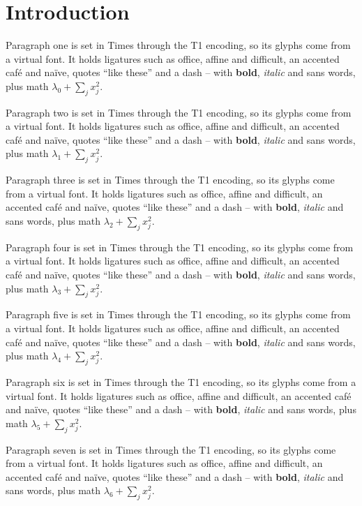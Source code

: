 \documentclass{article}
\begin{document}
\section{Introduction}

Paragraph one is set in Times through the T1 encoding, so its glyphs come from a virtual font.
It holds ligatures such as office, affine and difficult, an accented caf\'e and na\"ive, quotes ``like these''
and a dash -- with {\bfseries bold}, {\itshape italic} and {\sffamily sans} words, plus math $\lambda_0 + \sum_j x_j^2$.

Paragraph two is set in Times through the T1 encoding, so its glyphs come from a virtual font.
It holds ligatures such as office, affine and difficult, an accented caf\'e and na\"ive, quotes ``like these''
and a dash -- with {\bfseries bold}, {\itshape italic} and {\sffamily sans} words, plus math $\lambda_1 + \sum_j x_j^2$.

Paragraph three is set in Times through the T1 encoding, so its glyphs come from a virtual font.
It holds ligatures such as office, affine and difficult, an accented caf\'e and na\"ive, quotes ``like these''
and a dash -- with {\bfseries bold}, {\itshape italic} and {\sffamily sans} words, plus math $\lambda_2 + \sum_j x_j^2$.

Paragraph four is set in Times through the T1 encoding, so its glyphs come from a virtual font.
It holds ligatures such as office, affine and difficult, an accented caf\'e and na\"ive, quotes ``like these''
and a dash -- with {\bfseries bold}, {\itshape italic} and {\sffamily sans} words, plus math $\lambda_3 + \sum_j x_j^2$.

Paragraph five is set in Times through the T1 encoding, so its glyphs come from a virtual font.
It holds ligatures such as office, affine and difficult, an accented caf\'e and na\"ive, quotes ``like these''
and a dash -- with {\bfseries bold}, {\itshape italic} and {\sffamily sans} words, plus math $\lambda_4 + \sum_j x_j^2$.

Paragraph six is set in Times through the T1 encoding, so its glyphs come from a virtual font.
It holds ligatures such as office, affine and difficult, an accented caf\'e and na\"ive, quotes ``like these''
and a dash -- with {\bfseries bold}, {\itshape italic} and {\sffamily sans} words, plus math $\lambda_5 + \sum_j x_j^2$.

Paragraph seven is set in Times through the T1 encoding, so its glyphs come from a virtual font.
It holds ligatures such as office, affine and difficult, an accented caf\'e and na\"ive, quotes ``like these''
and a dash -- with {\bfseries bold}, {\itshape italic} and {\sffamily sans} words, plus math $\lambda_6 + \sum_j x_j^2$.
\end{document}
